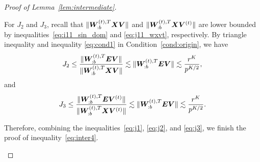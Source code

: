 \documentclass[lettersize,journal]{IEEEtran}
\theoremstyle{definition}
\theoremstyle{definition}
\begin{document}
\begin{proof}[Proof of Lemma~\ref{lem:intermediate}]
\begin{enumerate}
    
    For $J_2$ and $J_3$, recall that $\lVert\bm{W}_{:b}^{(t),T} \bm X \bm{V} \rVert$ and $\lVert\bm{W}_{:b}^{(t),T} \bm X \bm{V}^{(t)} \rVert$ are lower bounded by inequalities~\eqref{eq:i11_sin_dom} and \eqref{eq:j11_wxvt}, respectively. By triangle inequality and inequality \eqref{eq:cond1} in Condition~\ref{cond:origin}, we have 
    \begin{equation}\label{eq:j2}
        J_2 \leq \frac{ \onormSize{}{\mW_{:b}^{(t),T} \mE \mV}  }{  \onormSize{}{\mW_{:b}^{(t),T} \mX \mV} } \lesssim \onormSize{}{\mW_{:b}^{(t),T} \mE \mV} \lesssim \frac{r^K}{p^{K/2}},
    \end{equation}
    and 
    \begin{equation}\label{eq:j3}
        J_3 \leq \frac{ \onormSize{}{\mW_{:b}^{(t),T} \mE \mV^{(t)}}  }{  \onormSize{}{\mW_{:b}^{(t),T} \mX \mV^{(t)}} } \lesssim \onormSize{}{\mW_{:b}^{(t),T} \mE \mV} \lesssim \frac{r^K}{p^{K/2}}.
    \end{equation}
    
    Therefore, combining the inequalities~\eqref{eq:j1}, \eqref{eq:j2}, and \eqref{eq:j3}, we finish the proof of inequality~\eqref{eq:inter4}. 
    
    


\end{enumerate}
\end{proof}
\end{document}
